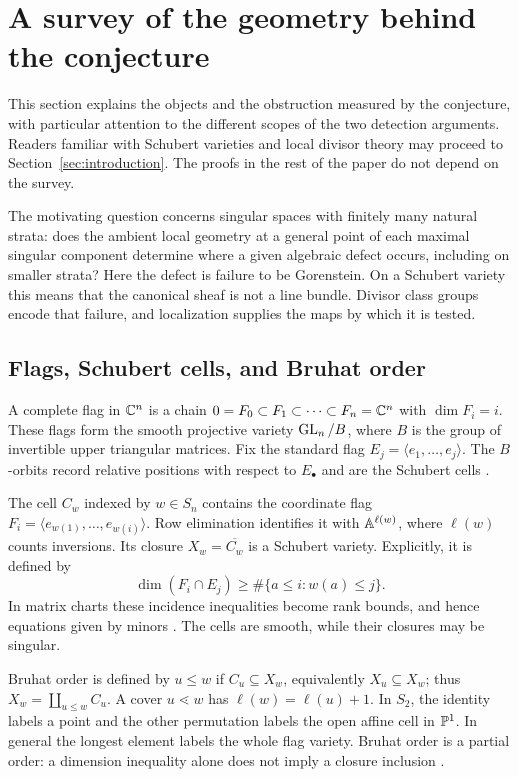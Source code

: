 \section{A survey of the geometry behind the conjecture}\label{sec:survey}

This section explains the objects and the obstruction measured by the conjecture, with particular attention to the different scopes of the two detection arguments. Readers familiar with Schubert varieties and local divisor theory may proceed to Section~\ref{sec:introduction}. The proofs in the rest of the paper do not depend on the survey.

The motivating question concerns singular spaces with finitely many natural strata: does the ambient local geometry at a general point of each maximal singular component determine where a given algebraic defect occurs, including on smaller strata? Here the defect is failure to be Gorenstein. On a Schubert variety this means that the canonical sheaf is not a line bundle. Divisor class groups encode that failure, and localization supplies the maps by which it is tested.

\subsection{Flags, Schubert cells, and Bruhat order}
A complete flag in $\mathbb C^n$ is a chain $0=F_0\subset F_1\subset\cdots\subset F_n=\mathbb C^n$ with $\dim F_i=i$. These flags form the smooth projective variety $\operatorname{GL}_n/B$, where $B$ is the group of invertible upper triangular matrices. Fix the standard flag $E_j=\langle e_1,\ldots,e_j\rangle$. The $B$-orbits record relative positions with respect to $E_\bullet$ and are the Schubert cells \cite[Section~1.2]{Bri05}.

The cell $C_w$ indexed by $w\in S_n$ contains the coordinate flag $F_i=\langle e_{w(1)},\ldots,e_{w(i)}\rangle$. Row elimination identifies it with $\mathbb A^{\ell(w)}$, where $\ell(w)$ counts inversions. Its closure $X_w=\overline{C_w}$ is a Schubert variety. Explicitly, it is defined by
\[
 \dim(F_i\cap E_j)\ge\#\{a\le i:w(a)\le j\}.
\]
In matrix charts these incidence inequalities become rank bounds, and hence equations given by minors \cite[Section~3]{WY08}. The cells are smooth, while their closures may be singular.

Bruhat order is defined by $u\le w$ if $C_u\subseteq X_w$, equivalently $X_u\subseteq X_w$; thus $X_w=\coprod_{u\le w}C_u$. A cover $u\lessdot w$ has $\ell(w)=\ell(u)+1$. In $S_2$, the identity labels a point and the other permutation labels the open affine cell in $\mathbb P^1$. In general the longest element labels the whole flag variety. Bruhat order is a partial order: a dimension inequality alone does not imply a closure inclusion \cite[Chapter~2]{BB05}.

